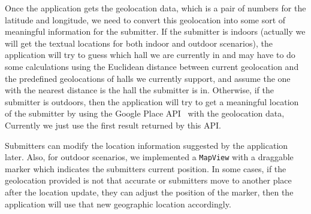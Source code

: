 \documentclass{acm_proc_article-sp}
\begin{document}
 Once the application gets the geolocation data, which is a pair of numbers for the latitude and longitude, 
 we need to convert this geolocation into some sort of meaningful information for the submitter.
 If the submitter is indoors (actually we will get the textual locations for both indoor and outdoor scenarios), 
 the application will try to guess which hall we are currently in and may have to do some calculations using the Euclidean distance between current geolocation 
 and the predefined geolocations of halls we currently support, and assume the one with the nearest distance is the hall the submitter is in. 
 Otherwise, if the submitter is outdoors, then the application will try to get a meaningful location of the submitter by using 
 the Google Place API~\cite{google-place-api} with the geolocation data, Currently we just use the first result returned by this API.
 
 Submitters can modify the location information suggested by the application later. Also, for outdoor scenarios, 
 we implemented a \texttt{MapView} with a draggable marker which indicates the submitters current position. 
 In some cases, if the geolocation provided is not that accurate or submitters move to another place after the location update, 
 they can adjust the position of the marker, then the application will use that new geographic location accordingly.
 
\end{document}
